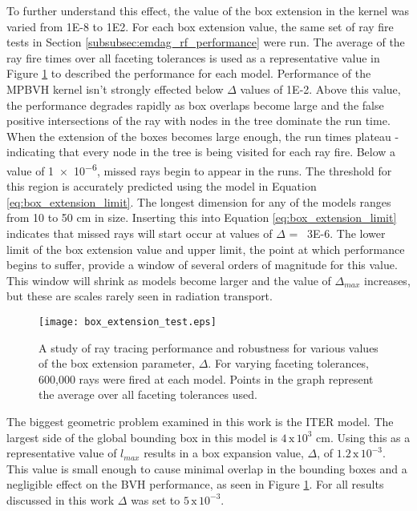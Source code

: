 To further understand this effect, the value of the box extension in the kernel
was varied from \num{1E-8} to \num{1E2}. For each box extension value, the same
set of ray fire tests in Section \ref{subsubsec:emdag_rf_performance} were
run. The average of the ray fire times over all faceting tolerances is used as a
representative value in Figure \ref{fig:box_bump_tests} to described the
performance for each model. Performance of the MPBVH kernel isn't strongly
effected below $\Delta$ values of \num{1E-2}. Above this value, the performance
degrades rapidly as box overlaps become large and the false positive
intersections of the ray with nodes in the tree dominate the run time. When the
extension of the boxes becomes large enough, the run times plateau - indicating
that every node in the tree is being visited for each ray fire. Below a value of
\num{1e-6}, missed rays begin to appear in the runs. The threshold for this
region is accurately predicted using the model in Equation
\eqref{eq:box_extension_limit}. The longest dimension for any of the models ranges
from 10 to 50 cm in size. Inserting this into Equation
\eqref{eq:box_extension_limit} indicates that missed rays will start occur at
values of $\Delta$ = ~\num{3E-6}. The lower limit of the box extension value and
upper limit, the point at which performance begins to suffer, provide a window
of several orders of magnitude for this value. This window will shrink as models
become larger and the value of $\Delta_{max}$ increases, but these are scales
rarely seen in radiation transport.

\begin{figure}[H]
  \centering
  \texttt{[image: box\_extension\_test.eps]}
  \caption[Results of ray fire performance for various box extension values.]{A
    study of ray tracing performance and robustness for various values of the
    box extension parameter, $\Delta$. For varying faceting tolerances, 600,000
    rays were fired at each model. Points in the graph represent the average
    over all faceting tolerances used.}
  \label{fig:box_bump_tests}
\end{figure}

The biggest geometric problem examined in this work is the ITER model. The
largest side of the global bounding box in this model is $4 \, \text{x} \,
10^{3}$ cm. Using this as a representative value of $l_{max}$ results in a box
expansion value, $\Delta$, of $1.2 \, \text{x} \, 10^{-3}$. This value is small
enough to cause minimal overlap in the bounding boxes and a negligible effect on
the BVH performance, as seen in Figure \ref{fig:box_bump_tests}. For all results
discussed in this work $\Delta$ was set to $5 \, \text{x} \, 10 ^{-3}$.

